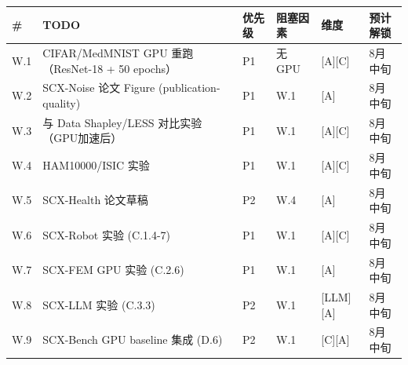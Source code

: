 \documentclass[
  12pt,
]{ctexart}
\begin{document}
\begin{longtable}[]{@{}
  >{\raggedright\arraybackslash}p{}
  >{\raggedright\arraybackslash}p{}
  >{\raggedright\arraybackslash}p{}
  >{\raggedright\arraybackslash}p{}
  >{\raggedright\arraybackslash}p{}
  >{\raggedright\arraybackslash}p{}@{}}
\toprule\noalign{}
\begin{minipage}[b]{\linewidth}\raggedright
\#
\end{minipage} & \begin{minipage}[b]{\linewidth}\raggedright
TODO
\end{minipage} & \begin{minipage}[b]{\linewidth}\raggedright
优先级
\end{minipage} & \begin{minipage}[b]{\linewidth}\raggedright
阻塞因素
\end{minipage} & \begin{minipage}[b]{\linewidth}\raggedright
维度
\end{minipage} & \begin{minipage}[b]{\linewidth}\raggedright
预计解锁
\end{minipage} \\
\midrule\noalign{}
\endhead
\bottomrule\noalign{}
\endlastfoot
W.1 & CIFAR/MedMNIST GPU 重跑（ResNet-18 + 50 epochs） & P1 & 无 GPU &
{[}A{]}{[}C{]} & 8月中旬 \\
W.2 & SCX-Noise 论文 Figure (publication-quality) & P1 & W.1 & {[}A{]} &
8月中旬 \\
W.3 & 与 Data Shapley/LESS 对比实验（GPU加速后） & P1 & W.1 &
{[}A{]}{[}C{]} & 8月中旬 \\
W.4 & HAM10000/ISIC 实验 & P1 & W.1 & {[}A{]}{[}C{]} & 8月中旬 \\
W.5 & SCX-Health 论文草稿 & P2 & W.4 & {[}A{]} & 8月中旬 \\
W.6 & SCX-Robot 实验 (C.1.4-7) & P1 & W.1 & {[}A{]}{[}C{]} & 8月中旬 \\
W.7 & SCX-FEM GPU 实验 (C.2.6) & P1 & W.1 & {[}A{]} & 8月中旬 \\
W.8 & SCX-LLM 实验 (C.3.3) & P2 & W.1 & {[}LLM{]}{[}A{]} & 8月中旬 \\
W.9 & SCX-Bench GPU baseline 集成 (D.6) & P2 & W.1 & {[}C{]}{[}A{]} &
8月中旬 \\
\end{longtable}
\end{document}
